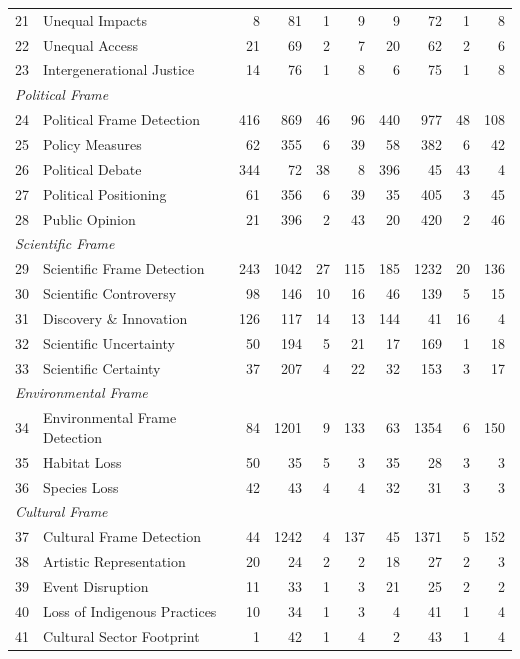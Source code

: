 {\begin{longtable}{p{0.5cm}p{5.5cm}rrrrrrrr}
21 & Unequal Impacts & 8 & 81 & 1 & 9 & 9 & 72 & 1 & 8 \\
22 & Unequal Access & 21 & 69 & 2 & 7 & 20 & 62 & 2 & 6 \\
23 & Intergenerational Justice & 14 & 76 & 1 & 8 & 6 & 75 & 1 & 8 \\
\multicolumn{10}{l}{\textit{Political Frame}} \\
24 & Political Frame Detection & 416 & 869 & 46 & 96 & 440 & 977 & 48 & 108 \\
25 & Policy Measures & 62 & 355 & 6 & 39 & 58 & 382 & 6 & 42 \\
26 & Political Debate & 344 & 72 & 38 & 8 & 396 & 45 & 43 & 4 \\
27 & Political Positioning & 61 & 356 & 6 & 39 & 35 & 405 & 3 & 45 \\
28 & Public Opinion & 21 & 396 & 2 & 43 & 20 & 420 & 2 & 46 \\
\multicolumn{10}{l}{\textit{Scientific Frame}} \\
29 & Scientific Frame Detection & 243 & 1042 & 27 & 115 & 185 & 1232 & 20 & 136 \\
30 & Scientific Controversy & 98 & 146 & 10 & 16 & 46 & 139 & 5 & 15 \\
31 & Discovery \& Innovation & 126 & 117 & 14 & 13 & 144 & 41 & 16 & 4 \\
32 & Scientific Uncertainty & 50 & 194 & 5 & 21 & 17 & 169 & 1 & 18 \\
33 & Scientific Certainty & 37 & 207 & 4 & 22 & 32 & 153 & 3 & 17 \\
\multicolumn{10}{l}{\textit{Environmental Frame}} \\
34 & Environmental Frame Detection & 84 & 1201 & 9 & 133 & 63 & 1354 & 6 & 150 \\
35 & Habitat Loss & 50 & 35 & 5 & 3 & 35 & 28 & 3 & 3 \\
36 & Species Loss & 42 & 43 & 4 & 4 & 32 & 31 & 3 & 3 \\
\multicolumn{10}{l}{\textit{Cultural Frame}} \\
37 & Cultural Frame Detection & 44 & 1242 & 4 & 137 & 45 & 1371 & 5 & 152 \\
38 & Artistic Representation & 20 & 24 & 2 & 2 & 18 & 27 & 2 & 3 \\
39 & Event Disruption & 11 & 33 & 1 & 3 & 21 & 25 & 2 & 2 \\
40 & Loss of Indigenous Practices & 10 & 34 & 1 & 3 & 4 & 41 & 1 & 4 \\
41 & Cultural Sector Footprint & 1 & 42 & 1 & 4 & 2 & 43 & 1 & 4 \\

\end{longtable}}

